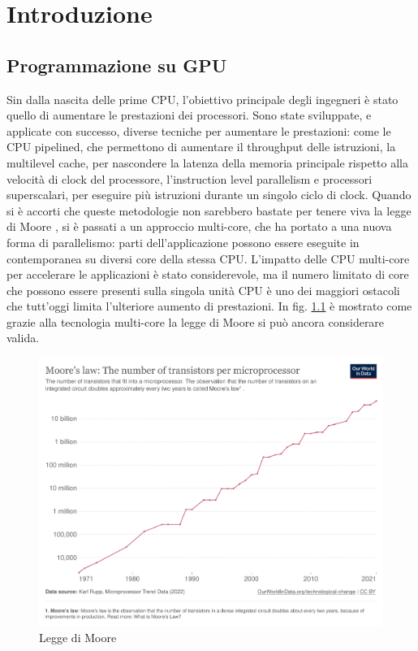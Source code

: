 \chapter{Introduzione}
\label{sec:intro}


\section[Programmazione su GPU]{Programmazione su GPU}

Sin dalla nascita delle prime \gls{CPU}, l'obiettivo principale degli ingegneri è stato quello di aumentare le prestazioni dei processori. Sono state sviluppate, e applicate con successo, diverse tecniche per aumentare le prestazioni: come le CPU pipelined, che permettono di aumentare il throughput delle istruzioni, la multilevel cache, per nascondere la latenza della memoria principale rispetto alla velocità di clock del processore, l'instruction level parallelism e processori superscalari, per eseguire più istruzioni durante un singolo ciclo di clock.
Quando si è accorti che queste metodologie non sarebbero bastate per tenere viva la legge di Moore \cite[]{Moore:law}, si è passati a un approccio multi-core, che ha portato a una nuova forma di parallelismo: parti dell'applicazione possono essere eseguite in contemporanea su diversi core della stessa CPU. L'impatto delle CPU multi-core per accelerare le applicazioni è stato considerevole, ma il numero limitato di core che possono essere presenti sulla singola unità CPU è uno dei maggiori ostacoli che tutt'oggi limita l'ulteriore aumento di prestazioni. In fig. \ref{fig:moore_law} è mostrato come grazie alla tecnologia multi-core la legge di Moore si può ancora considerare valida.

\begin{figure}[ht]
\centering
\includegraphics[width=.9\linewidth]{images/chapter1/moore_law2.png}
\caption{Legge di Moore}
\label{fig:moore_law}
\end{figure}

